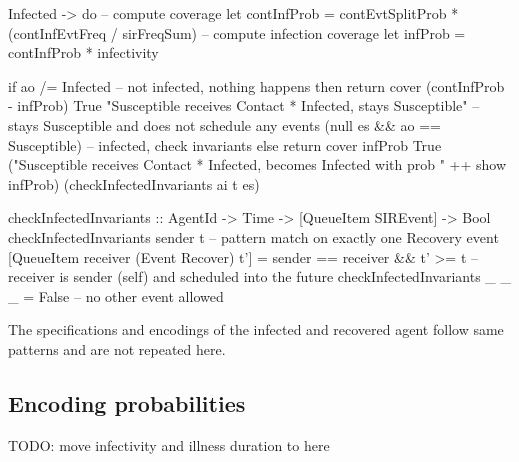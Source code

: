 \begin{HaskellCode}
Infected -> do
  -- compute coverage
  let contInfProb = contEvtSplitProb * (contInfEvtFreq / sirFreqSum)
  -- compute infection coverage
  let infProb = contInfProb * infectivity

  if ao /= Infected
    -- not infected, nothing happens
    then return
          cover (contInfProb - infProb) True "Susceptible receives Contact * Infected, stays Susceptible"
            -- stays Susceptible and does not schedule any events 
            (null es && ao == Susceptible) 
    -- infected, check invariants
    else return 
          cover infProb True ("Susceptible receives Contact * Infected, becomes Infected with prob " ++ show infProb)
            (checkInfectedInvariants ai t es)
            
checkInfectedInvariants :: AgentId -> Time -> [QueueItem SIREvent] -> Bool
checkInfectedInvariants sender t 
    -- pattern match on exactly one Recovery event
    [QueueItem receiver (Event Recover) t'] 
  = sender == receiver && t' >= t           -- receiver is sender (self) and scheduled into the future
checkInfectedInvariants _ _ _ = False       -- no other event allowed
\end{HaskellCode}

The specifications and encodings of the infected and recovered agent follow same patterns and are not repeated here.

\subsection{Encoding probabilities}
TODO: move infectivity and illness duration to here

